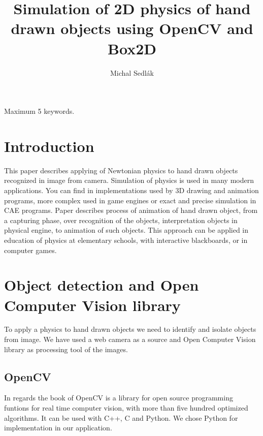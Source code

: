 \documentclass{ifacconf}
\begin{document}
\begin{frontmatter}
\title{Simulation of 2D physics of hand drawn objects using OpenCV and Box2D}
\author[Bratislava]{Michal Sedlák}
\address[Bratislava]{Faculty of Electrical Engineering and Information Technology, Slovak University of Technology,
Ilkovičova 3, 812 19 Bratislava, Slovakia
\\
(e-mail: michal.sedlak@stuba.sk)}
\begin{abstract}

\end{abstract}
\begin{keyword}
Maximum 5 keywords.
\end{keyword}
\end{frontmatter}

\section{Introduction}
This paper describes applying of Newtonian physics to hand drawn objects
recognized in image from camera. Simulation of physics is used in many modern
applications. You can find in implementations used by 3D drawing and animation
programs, more complex used in game engines or exact and precise simulation in
CAE programs. Paper describes process of animation of hand drawn object, from a
capturing phase, over recognition of the objects, interpretation objects in
physical engine, to animation of such objects. This approach can be applied in
education of physics at elementary schools, with interactive blackboards, or in
computer games.

\section{Object detection and Open Computer Vision library}
To apply a physics to hand drawn objects we need to identify and isolate
objects from image. We have used a web camera as a source and Open Computer
Vision library as processing tool of the images.

\subsection{OpenCV}
In regards the book of \cite{OpenCV} OpenCV  is a library for open source
programming funtions for real time computer vision, with more than five hundred
optimized algorithms. It can be used with C++, C and Python. We chose Python for
implementation in our application.
\end{document}
